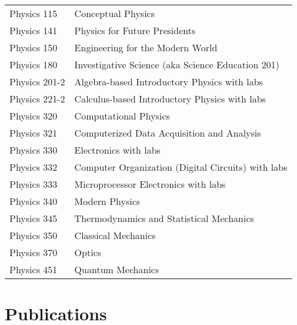 \documentclass[margin,line,letterpaper]{res}
\begin{document}
\begin{resume}
\begin{table}[h]
\begin{center}
\begin{tabular}{ll}
Physics 115 & Conceptual Physics\\
Physics 141 & Physics for Future Presidents\\
Physics 150 & Engineering for the Modern World\\
Physics 180 & Investigative Science (aka Science Education 201)\\ %
Physics 201-2 & Algebra-based Introductory Physics with labs\\ %
Physics 221-2 & Calculus-based Introductory Physics with labs\\ %
Physics 320 & Computational Physics\\ %
Physics 321 & Computerized Data Acquisition and Analysis\\ %
Physics 330 & Electronics with labs\\
Physics 332 & Computer Organization (Digital Circuits) with labs\\ %
Physics 333 & Microprocessor Electronics with labs\\
Physics 340 & Modern Physics\\
Physics 345 & Thermodynamics and Statistical Mechanics\\ %
Physics 350 & Classical Mechanics\\ %
Physics 370 & Optics\\
Physics 451 & Quantum Mechanics \\%
\end{tabular}
\end{center}
\end{table}


\section{\bf Publications}


\end{resume}
\end{document}
